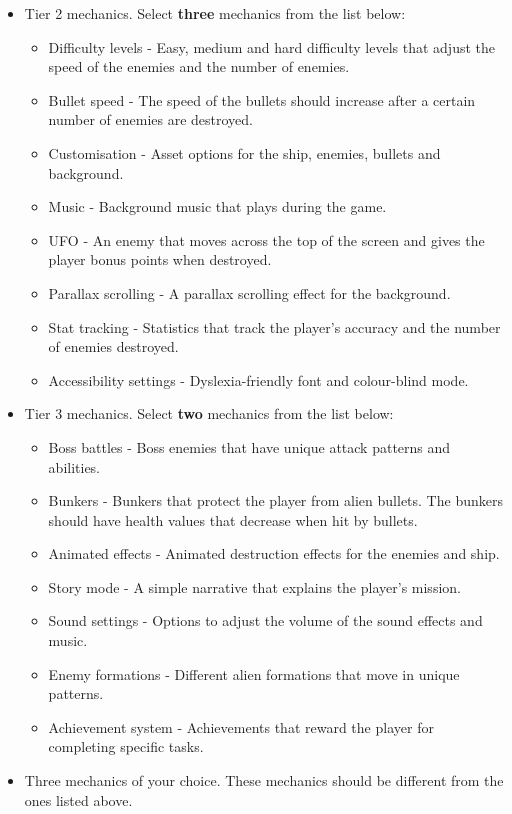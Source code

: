 \documentclass{article}
\begin{document}
\begin{itemize}
    \item Tier 2 mechanics. Select \textbf{three} mechanics from the list below:
    \begin{itemize}
        \item Difficulty levels - Easy, medium and hard difficulty levels that adjust the speed of the enemies and the number of enemies.
        \item Bullet speed - The speed of the bullets should increase after a certain number of enemies are destroyed.
        \item Customisation - Asset options for the ship, enemies, bullets and background.
        \item Music - Background music that plays during the game.
        \item UFO - An enemy that moves across the top of the screen and gives the player bonus points when destroyed.
        \item Parallax scrolling - A parallax scrolling effect for the background.
        \item Stat tracking - Statistics that track the player's accuracy and the number of enemies destroyed.
        \item Accessibility settings - Dyslexia-friendly font and colour-blind mode.
    \end{itemize}

    \item Tier 3 mechanics. Select \textbf{two} mechanics from the list below:
    \begin{itemize}
        \item Boss battles - Boss enemies that have unique attack patterns and abilities.
        \item Bunkers - Bunkers that protect the player from alien bullets. The bunkers should have health values that decrease when hit by bullets.
        \item Animated effects - Animated destruction effects for the enemies and ship.
        \item Story mode - A simple narrative that explains the player's mission.
        \item Sound settings - Options to adjust the volume of the sound effects and music.
        \item Enemy formations - Different alien formations that move in unique patterns.
        \item Achievement system - Achievements that reward the player for completing specific tasks.
    \end{itemize}

    \item Three mechanics of your choice. These mechanics should be different from the ones listed above.
\end{itemize}
\end{document}
